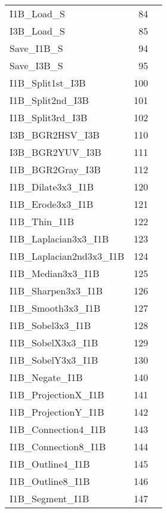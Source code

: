 \documentclass[11pt]{jsbook} %
\begin{document}
\begin{tabular}{l|r|l}
  I1B\_Load\_S                     & 84 &  \\
  I3B\_Load\_S                     & 85 &  \\
                           
  Save\_I1B\_S                     & 94 &  \\
  Save\_I3B\_S                     & 95 &  \\
                           
  I1B\_Split1st\_I3B               & 100 &  \\
  I1B\_Split2nd\_I3B               & 101 &  \\
  I1B\_Split3rd\_I3B               & 102 &  \\
                           
  I3B\_BGR2HSV\_I3B                & 110 &  \\
  I3B\_BGR2YUV\_I3B                & 111 &  \\
  I1B\_BGR2Gray\_I3B               & 112 &  \\
                           
  I1B\_Dilate3x3\_I1B              & 120 &  \\
  I1B\_Erode3x3\_I1B               & 121 &  \\
  I1B\_Thin\_I1B                   & 122 &  \\
                           
  I1B\_Laplacian3x3\_I1B           & 123 &  \\
  I1B\_Laplacian2nd3x3\_I1B        & 124 &  \\
  I1B\_Median3x3\_I1B              & 125 &  \\
  I1B\_Sharpen3x3\_I1B             & 126 &  \\
  I1B\_Smooth3x3\_I1B              & 127 &  \\
  I1B\_Sobel3x3\_I1B               & 128 &  \\
  I1B\_SobelX3x3\_I1B              & 129 &  \\
  I1B\_SobelY3x3\_I1B              & 130 &  \\
                           
  I1B\_Negate\_I1B                 & 140 &  \\
  I1B\_ProjectionX\_I1B            & 141 &  \\
  I1B\_ProjectionY\_I1B            & 142 &  \\
  I1B\_Connection4\_I1B            & 143 &  \\
  I1B\_Connection8\_I1B            & 144 &  \\
  I1B\_Outline4\_I1B               & 145 &  \\
  I1B\_Outline8\_I1B               & 146 &  \\
  I1B\_Segment\_I1B                & 147 &  \\
                           

\end{tabular}
\end{document}
